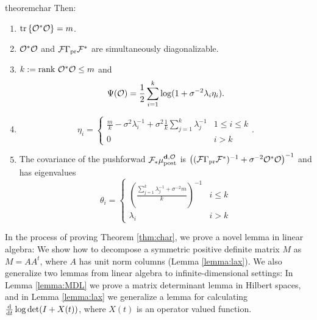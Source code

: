\begin{restatable}{theorem}{char}
  Then:
  \begin{enumerate}
  \item  $\textup{tr}\left \{\mathcal{O}^*\mathcal{O} \right \} = m$.
  \item $\mathcal{O}^*\mathcal{O}$ and $\mathcal{F}\Gamma_{\textup{pr}}\mathcal{F}^*$ are simultaneously
    diagonalizable.
  \item $k := \textup{rank}\  \mathcal{O}^*\mathcal{O} \leq m$ and
    \begin{equation*}
      \tar(\obs) = \frac12 \sum_{i=1}^{k} \log (1 + \sigma^{-2}\lambda_i\eta_i). %
    \end{equation*}
  \item
    \begin{equation*}
        \eta_i = \begin{cases}
          \frac{m}{k} - \sigma^2 \lambda_i^{-1} + \sigma^2 \frac{1}{k} \sum_{j=1}^k \lambda_j^{-1} & 1 \leq i \leq k \\
          0 & i > k 
        \end{cases}.
    \end{equation*}
  \item The covariance of the pushforwad $\mathcal{F}_{*} \mu_{\textup{post}}^{\mathbf{d}, \mathcal{O}}$ is $\left (
    (\mathcal{F} \Gamma_{\textup{pr}} \mathcal{F}^*)^{-1} + \sigma^{-2} \mathcal{O}^*\mathcal{O} \right )^{-1}$
    and has eigenvalues
    \begin{equation*}
      \theta_i =
      \begin{cases}
        \left(\frac{\sum_{j=1}^k \lambda_j^{-1} + \sigma^{-2}m}{k} \right )^{-1} & i \leq k \\
        \lambda_i &  i > k 
      \end{cases}
    \end{equation*}
  \end{enumerate}
\end{restatable}

In the process of proving Theorem \ref{thm:char}, we prove a novel
lemma in linear algebra: We show how to decompose a symmetric positive
definite matrix $M$ as $M = AA^t$, where $A$ has unit norm columns
(Lemma \ref{lemma:lax}). We also generalize two lemmas from linear
algebra to infinite-dimensional settings: In Lemma \ref{lemma:MDL} we
prove a matrix determinant lemma in Hilbert spaces, and in Lemma
\ref{lemma:lax} we generalize a lemma \cite{Lax07} for calculating
$\frac{\text{\textup{d}}}{\text{\textup{d}} t} \log \det (I + X(t))$, where $X(t)$ is an
operator valued function.

